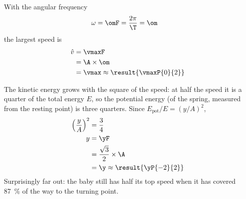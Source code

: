 \begin{abcliste}
\abc
With the angular frequency
\begin{align}
 \omega &= \omF = \frac{2\pi}{\T} = \om
\end{align}
the largest speed is
\begin{align}
 \hat v &= \vmaxF \\
   &= \A\times\om \\
   &= \vmax \approx \result{\vmaxP{0}{2}}
\end{align}

\abc
The kinetic energy grows with the square of the speed: at half the speed it is a quarter of the total energy $E$, so the potential energy (of the spring, measured from the resting point) is three quarters. Since $E_\mathrm{pot}/E = (y/A)^2$,
\begin{align}
 \left(\frac{y}{A}\right)^2 &= \frac{3}{4} \\
 y &= \yF \\
   &= \frac{\sqrt{3}}{2}\times\A \\
   &= \y \approx \result{\yP{-2}{2}}
\end{align}
Surprisingly far out: the baby still has half its top speed when it has covered \SI{87}{\percent} of the way to the turning point.
\end{abcliste}

